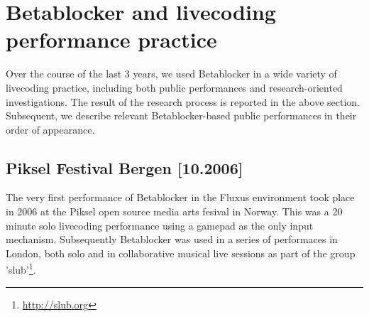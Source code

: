 \documentclass[letterpaper, 12pt]{article}
\begin{document}
% 
% 
% 
% 
% 
% 
% 
% 
% 
% 
% 
% 
% 
\parskip 18pt

\section{Betablocker and livecoding performance practice} 
\label{sec:betablocker_and_livecoding_practice_a_report}

Over the course of the last 3 years, we used Betablocker in a wide variety of livecoding practice, including both public performances and research-oriented investigations.
The result of the research process is reported in the above section.
Subsequent, we describe relevant Betablocker-based public performances in their order of appearance.

\subsection{Piksel Festival Bergen [10.2006]}
\label{sub:piksel}

The very first performance of Betablocker in the Fluxus environment took place in 2006 at the Piksel open source media arts fesival in Norway. This was a 20 minute solo livecoding performance using a gamepad as the only input mechanism. Subsequently Betablocker was used in a series of performaces in London, both solo and in collaborative musical live sessions as part of the group 'slub'\footnote{\url{http://slub.org}}. 
\end{document}
